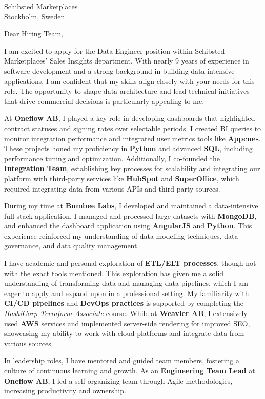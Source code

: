 \documentclass{letter}
\begin{document}
\begin{letter}{Schibsted Marketplaces\\
Stockholm, Sweden}

\opening{Dear Hiring Team,}

I am excited to apply for the Data Engineer position within Schibsted Marketplaces' Sales Insights department. With nearly 9 years of experience in software development and a strong background in building data-intensive applications, I am confident that my skills align closely with your needs for this role. The opportunity to shape data architecture and lead technical initiatives that drive commercial decisions is particularly appealing to me.

At \textbf{Oneflow AB}, I played a key role in developing dashboards that highlighted contract statuses and signing rates over selectable periods. I created BI queries to monitor integration performance and integrated user metrics tools like \textbf{Appcues}. These projects honed my proficiency in \textbf{Python} and advanced \textbf{SQL}, including performance tuning and optimization. Additionally, I co-founded the \textbf{Integration Team}, establishing key processes for scalability and integrating our platform with third-party services like \textbf{HubSpot} and \textbf{SuperOffice}, which required integrating data from various APIs and third-party sources.

During my time at \textbf{Bumbee Labs}, I developed and maintained a data-intensive full-stack application. I managed and processed large datasets with \textbf{MongoDB}, and enhanced the dashboard application using \textbf{AngularJS} and \textbf{Python}. This experience reinforced my understanding of data modeling techniques, data governance, and data quality management.

I have academic and personal exploration of \textbf{ETL/ELT processes}, though not with the exact tools mentioned. This exploration has given me a solid understanding of transforming data and managing data pipelines, which I am eager to apply and expand upon in a professional setting. My familiarity with \textbf{CI/CD pipelines} and \textbf{DevOps practices} is supported by completing the \textit{HashiCorp Terraform Associate} course. While at \textbf{Weavler AB}, I extensively used \textbf{AWS} services and implemented server-side rendering for improved SEO, showcasing my ability to work with cloud platforms and integrate data from various sources.

In leadership roles, I have mentored and guided team members, fostering a culture of continuous learning and growth. As an \textbf{Engineering Team Lead} at \textbf{Oneflow AB}, I led a self-organizing team through Agile methodologies, increasing productivity and ownership.


\end{letter}
\end{document}
